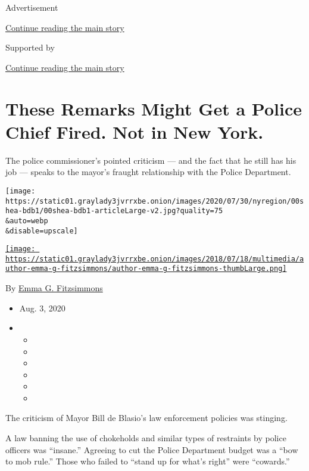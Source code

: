 Advertisement

\protect\hyperlink{after-top}{Continue reading the main story}

Supported by

\protect\hyperlink{after-sponsor}{Continue reading the main story}

\hypertarget{these-remarks-might-get-a-police-chief-fired-not-in-new-york}{%
\section{These Remarks Might Get a Police Chief Fired. Not in New
York.}\label{these-remarks-might-get-a-police-chief-fired-not-in-new-york}}

The police commissioner's pointed criticism --- and the fact that he
still has his job --- speaks to the mayor's fraught relationship with
the Police Department.

\texttt{[image: https://static01.graylady3jvrrxbe.onion/images/2020/07/30/nyregion/00shea-bdb1/00shea-bdb1-articleLarge-v2.jpg?quality=75\\\&auto=webp\\\&disable=upscale]}

\href{https://www.nytimes3xbfgragh.onion/by/emma-g-fitzsimmons}{\texttt{[image: https://static01.graylady3jvrrxbe.onion/images/2018/07/18/multimedia/author-emma-g-fitzsimmons/author-emma-g-fitzsimmons-thumbLarge.png]}}

By \href{https://www.nytimes3xbfgragh.onion/by/emma-g-fitzsimmons}{Emma
G. Fitzsimmons}

\begin{itemize}
\item
  Aug. 3, 2020
\item
  \begin{itemize}
  \item
  \item
  \item
  \item
  \item
  \item
  \end{itemize}
\end{itemize}

The criticism of Mayor Bill de Blasio's law enforcement policies was
stinging.

A law banning the use of chokeholds and similar types of restraints by
police officers was ``insane.'' Agreeing to cut the Police Department
budget was a ``bow to mob rule.'' Those who failed to ``stand up for
what's right'' were ``cowards.''

